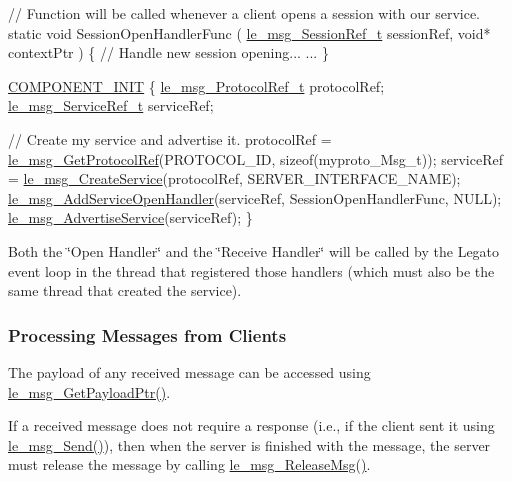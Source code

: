 \begin{DoxyCode}
\textcolor{comment}{// Function will be called whenever a client opens a session with our service.}
\textcolor{keyword}{static} \textcolor{keywordtype}{void} SessionOpenHandlerFunc
(
    \hyperlink{le__messaging_8h_aebfc01e15b430a5b4f3038a5bd518904}{le\_msg\_SessionRef\_t}  sessionRef, 
    \textcolor{keywordtype}{void}*                contextPtr  
)
\{
    \textcolor{comment}{// Handle new session opening...}
    ...
\}

\hyperlink{le__event_loop_8h_abdb9187a56836a93d19cc793cbd4b7ec}{COMPONENT\_INIT}
\{
    \hyperlink{le__messaging_8h_ac05e9b3268f8fb5776adab6fe11410e5}{le\_msg\_ProtocolRef\_t} protocolRef;
    \hyperlink{le__messaging_8h_ad9f0b13cde1d8c1eab5318dbcf0d9e28}{le\_msg\_ServiceRef\_t} serviceRef;

    \textcolor{comment}{// Create my service and advertise it.}
    protocolRef = \hyperlink{le__messaging_8h_adcd1ff1a6906433aaa6d7038125c4473}{le\_msg\_GetProtocolRef}(PROTOCOL\_ID, \textcolor{keyword}{sizeof}(myproto\_Msg\_t));
    serviceRef = \hyperlink{le__messaging_8h_adbbb2737069b636028128c74ae407742}{le\_msg\_CreateService}(protocolRef, SERVER\_INTERFACE\_NAME);
    \hyperlink{le__messaging_8h_a829d6450d487166e0b2994b4bf44ee5d}{le\_msg\_AddServiceOpenHandler}(serviceRef, SessionOpenHandlerFunc, NULL);
    \hyperlink{le__messaging_8h_ad3ff11d1962840f879d9c8fe7054de0c}{le\_msg\_AdvertiseService}(serviceRef);
\}
\end{DoxyCode}


Both the \char`\"{}\+Open Handler\char`\"{} and the \char`\"{}\+Receive Handler\char`\"{} will be called by the Legato event loop in the thread that registered those handlers (which must also be the same thread that created the service).\hypertarget{c_messaging_c_messagingServerProcessingMessages}{}\subsubsection{Processing Messages from Clients}\label{c_messaging_c_messagingServerProcessingMessages}
The payload of any received message can be accessed using \hyperlink{le__messaging_8h_a32d1c7ffd913db8546f6f1bd5cce58c4}{le\+\_\+msg\+\_\+\+Get\+Payload\+Ptr()}.

If a received message does not require a response (i.\+e., if the client sent it using \hyperlink{le__messaging_8h_a073de097d281475c44a445b927fbb929}{le\+\_\+msg\+\_\+\+Send()}), then when the server is finished with the message, the server must release the message by calling \hyperlink{le__messaging_8h_afc508c24d0b6933e8fbc4e0410d50271}{le\+\_\+msg\+\_\+\+Release\+Msg()}.


